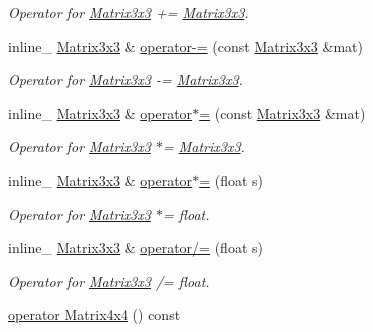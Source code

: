 \begin{DoxyCompactItemize}
\begin{DoxyCompactList}\small\item\em Operator for \hyperlink{class_matrix3x3}{Matrix3x3} += \hyperlink{class_matrix3x3}{Matrix3x3}. \end{DoxyCompactList}\item 
\hypertarget{class_matrix3x3_a787a01c0e7b22160992a99c4a7cf8cfe}{inline\+\_\+ \hyperlink{class_matrix3x3}{Matrix3x3} \& \hyperlink{class_matrix3x3_a787a01c0e7b22160992a99c4a7cf8cfe}{operator-\/=} (const \hyperlink{class_matrix3x3}{Matrix3x3} \&mat)}\label{class_matrix3x3_a787a01c0e7b22160992a99c4a7cf8cfe}

\begin{DoxyCompactList}\small\item\em Operator for \hyperlink{class_matrix3x3}{Matrix3x3} -\/= \hyperlink{class_matrix3x3}{Matrix3x3}. \end{DoxyCompactList}\item 
\hypertarget{class_matrix3x3_a0b111cd6ad50d5521b5ea1d8b1e6a2a3}{inline\+\_\+ \hyperlink{class_matrix3x3}{Matrix3x3} \& \hyperlink{class_matrix3x3_a0b111cd6ad50d5521b5ea1d8b1e6a2a3}{operator$\ast$=} (const \hyperlink{class_matrix3x3}{Matrix3x3} \&mat)}\label{class_matrix3x3_a0b111cd6ad50d5521b5ea1d8b1e6a2a3}

\begin{DoxyCompactList}\small\item\em Operator for \hyperlink{class_matrix3x3}{Matrix3x3} $\ast$= \hyperlink{class_matrix3x3}{Matrix3x3}. \end{DoxyCompactList}\item 
\hypertarget{class_matrix3x3_a3762041f07d0b9e7100b44f3220822c4}{inline\+\_\+ \hyperlink{class_matrix3x3}{Matrix3x3} \& \hyperlink{class_matrix3x3_a3762041f07d0b9e7100b44f3220822c4}{operator$\ast$=} (float s)}\label{class_matrix3x3_a3762041f07d0b9e7100b44f3220822c4}

\begin{DoxyCompactList}\small\item\em Operator for \hyperlink{class_matrix3x3}{Matrix3x3} $\ast$= float. \end{DoxyCompactList}\item 
\hypertarget{class_matrix3x3_ac60380215cd70ecb2445498901241d76}{inline\+\_\+ \hyperlink{class_matrix3x3}{Matrix3x3} \& \hyperlink{class_matrix3x3_ac60380215cd70ecb2445498901241d76}{operator/=} (float s)}\label{class_matrix3x3_ac60380215cd70ecb2445498901241d76}

\begin{DoxyCompactList}\small\item\em Operator for \hyperlink{class_matrix3x3}{Matrix3x3} /= float. \end{DoxyCompactList}\item 
\hypertarget{class_matrix3x3_a6c18a333c52912661fe2017a882b9b4f}{\hyperlink{class_matrix3x3_a6c18a333c52912661fe2017a882b9b4f}{operator Matrix4x4} () const }\label{class_matrix3x3_a6c18a333c52912661fe2017a882b9b4f}


\end{DoxyCompactItemize}
